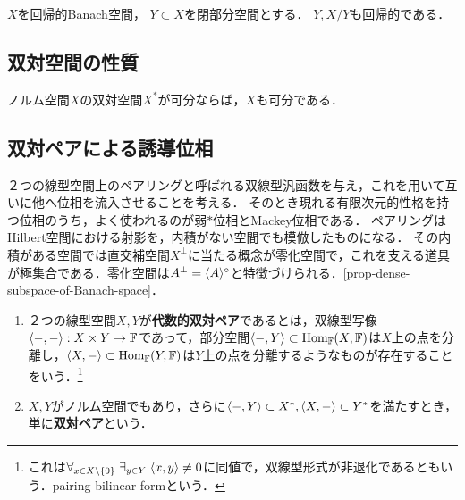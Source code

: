 \documentclass[uplatex,dvipdfmx]{jsreport}
\begin{document}
\begin{proposition}
    $X$を回帰的Banach空間，
    $Y\subset X$を閉部分空間とする．
    $Y,X/Y$も回帰的である．
\end{proposition}

\subsection{双対空間の性質}

\begin{proposition}
    ノルム空間$X$の双対空間$X^*$が可分ならば，$X$も可分である．
\end{proposition}

\subsection{双対ペアによる誘導位相}

\begin{tcolorbox}[colframe=ForestGreen, colback=ForestGreen!10!white,breakable,colbacktitle=ForestGreen!40!white,coltitle=black,fonttitle=\bfseries\sffamily,
title=]
    ２つの線型空間上のペアリングと呼ばれる双線型汎函数を与え，これを用いて互いに他へ位相を流入させることを考える．
    そのとき現れる有限次元的性格を持つ位相のうち，よく使われるのが弱$*$位相とMackey位相である．
    ペアリングはHilbert空間における射影を，内積がない空間でも模倣したものになる．
    その内積がある空間では直交補空間$X^\perp$に当たる概念が零化空間で，これを支える道具が極集合である．零化空間は$A^\perp=\langle A\rangle^\circ$と特徴づけられる．\ref{prop-dense-subspace-of-Banach-space}．
\end{tcolorbox}

\begin{definition}\mbox{}
    \begin{enumerate}
        \item ２つの線型空間$X,Y$が\textbf{代数的双対ペア}であるとは，双線型写像$\langle-,-\rangle:X\times Y\to\mathbb{F}$であって，部分空間$\langle-,Y\rangle\subset\mathrm{Hom}_{\mathbb{F}}(X,\mathbb{F})$は$X$上の点を分離し，$\langle X,-\rangle\subset\mathrm{Hom}_{\mathbb{F}}(Y,\mathbb{F})$は$Y$上の点を分離するようなものが存在することをいう．\footnote{これは$\forall_{x\in X\setminus\{0\}}\;\exists_{y\in Y}\;\langle x,y\rangle\ne 0$に同値で，双線型形式が非退化であるともいう．pairing bilinear formという．}
        \item $X,Y$がノルム空間でもあり，さらに$\langle-,Y\rangle\subset X^*,\langle X,-\rangle\subset Y^*$を満たすとき，単に\textbf{双対ペア}という．
    \end{enumerate}
\end{definition}
\end{document}
